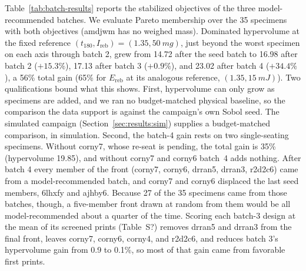 \documentclass[11pt]{article}
\providecommand{\siref}[1]{S?}
\begin{document}
Table~\ref{tab:batch-results} reports the stabilized objectives of the
three model-recommended batches. We evaluate Pareto membership over the
35 specimens with both objectives (amdjwm has no weighed mass).
Dominated hypervolume at the fixed reference
$(t_{180}, I_{\mathrm{reb}}) = (1.35, \SI{50}{mg})$, just beyond the
worst specimen on each axis through batch 2, grew from 14.72 after the
seed batch to 16.98 after batch 2 ($+15.3\%$), 17.13 after batch 3
($+0.9\%$), and 23.02 after batch 4 ($+34.4\%$), a 56\% total gain (65\%
for $E_{\mathrm{reb}}$ at its analogous reference, $(1.35, \SI{15}{mJ})$).
Two qualifications bound what this shows. First, hypervolume can only
grow as specimens are added, and we ran no budget-matched physical
baseline, so the comparison the data support is against the campaign's
own Sobol seed. The simulated campaign (Section~\ref{sec:results:sim})
supplies a budget-matched comparison, in simulation. Second, the batch-4 gain rests on two
single-seating specimens. Without corny7, whose re-seat is pending, the
total gain is 35\% (hypervolume 19.85), and without corny7 and corny6
batch~4 adds nothing. After batch 4 every member of the front (corny7,
corny6, drran5, drran3, r2d2c6) came from a model-recommended batch, and
corny7 and corny6 displaced the last seed members, 6lhxfy and ajhby6.
Because 27 of the 35 specimens came from those batches, though, a
five-member front drawn at random from them would be all
model-recommended about a quarter of the time. Scoring each batch-3
design at the mean of its screened prints
(Table~\siref{tab:si-round3-repeatability}) removes drran5 and drran3
from the final front, leaves corny7, corny6, corny4, and r2d2c6, and
reduces batch 3's hypervolume gain from 0.9 to 0.1\%, so most of that
gain came from favorable first prints.
\end{document}
